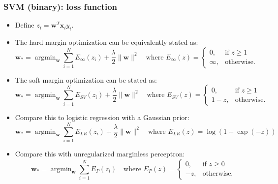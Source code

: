 \documentclass[ignorenonframetext,plain]{beamer}
\DeclareMathOperator*{\argmin}{argmin}
\renewcommand{\vec}{\mathbf}
\begin{document}
\begin{frame}\frametitle{SVM (binary): loss function} %
\small
\begin{itemize}
\item Define $z_i = \vec{w}^T\vec{x}_i y_i$.
\item The hard margin optimization can be equivalently stated as: \[
  \vec{w}_* = \argmin_\vec{w} \sum_{i=1}^N E_\infty(z_i) + \frac{\lambda}{2} \|\vec{w}\|^2
\quad\text{where }
E_\infty(z)=\begin{cases}
0,& \text{if } z \geq 1 \\
\infty,& \text{otherwise.}
\end{cases}
\]
\item The soft margin optimization can be stated as: \[
  \vec{w}_* = \argmin_\vec{w} \sum_{i=1}^N E_{SV}(z_i) + \frac{\lambda}{2} \|\vec{w}\|^2
\quad\text{where }
E_{SV}(z)=\begin{cases}
0,& \text{if } z \geq 1 \\
1-z,& \text{otherwise.}
\end{cases}
\]
\item Compare this to logistic regression with a Gaussian prior: \[
  \vec{w}_* = \argmin_\vec{w} \sum_{i=1}^N E_{LR}(z_i) + \frac{\lambda}{2} \|\vec{w}\|^2
\quad\text{where }
E_{LR}(z) = \log(1 + \exp(-z))
\]
\item Compare this with unregularized marginless perceptron: \[
  \vec{w}_* = \argmin_\vec{w} \sum_{i=1}^N E_P(z_i)
\quad\text{where }
E_{P}(z)=\begin{cases}
0,& \text{if } z \geq 0 \\
-z,& \text{otherwise.}
\end{cases}
\]
\end{itemize}
\end{frame}
\end{document}
